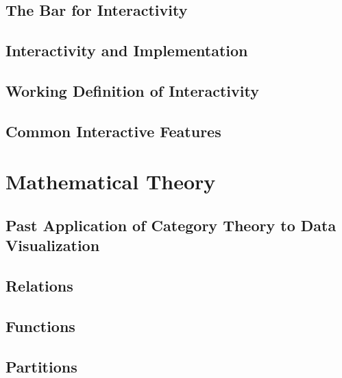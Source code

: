 \documentclass[
]{book}
\begin{document}
\hypertarget{the-bar-for-interactivity}{%
\subsection{The Bar for Interactivity}\label{the-bar-for-interactivity}}

\hypertarget{interactivity-and-implementation}{%
\subsection{Interactivity and Implementation}\label{interactivity-and-implementation}}

\hypertarget{working-definition-of-interactivity}{%
\subsection{Working Definition of Interactivity}\label{working-definition-of-interactivity}}

\hypertarget{common-interactive-features}{%
\subsection{Common Interactive Features}\label{common-interactive-features}}

\hypertarget{mathematical-theory}{%
\section{Mathematical Theory}\label{mathematical-theory}}

\hypertarget{past-application-of-category-theory-to-data-visualization}{%
\subsection{Past Application of Category Theory to Data Visualization}\label{past-application-of-category-theory-to-data-visualization}}

\hypertarget{relations}{%
\subsection{Relations}\label{relations}}

\hypertarget{functions}{%
\subsection{Functions}\label{functions}}

\hypertarget{partitions}{%
\subsection{Partitions}\label{partitions}}
\end{document}
